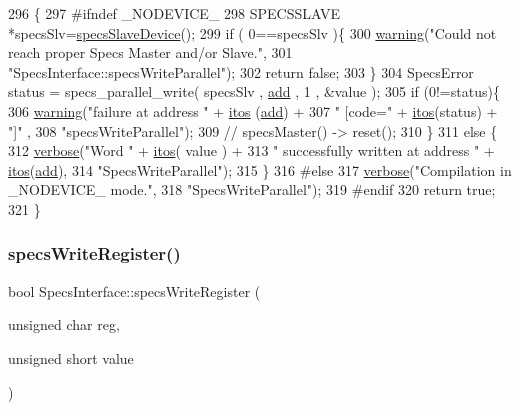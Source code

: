 \begin{DoxyCode}
296                                                 \{
297 \textcolor{preprocessor}{#ifndef \_NODEVICE\_
}
298   SPECSSLAVE *specsSlv=\hyperlink{classSpecsInterface_ac8d4711197f484f055533ec1e5ae01a1}{specsSlaveDevice}();
299   \textcolor{keywordflow}{if} ( 0==specsSlv )\{
300     \hyperlink{classObject_a65cd4fda577711660821fd2cd5a3b4c9}{warning}(\textcolor{stringliteral}{"Could not reach proper Specs Master and/or Slave."},
301             \textcolor{stringliteral}{"SpecsInterface::specsWriteParallel"});
302     \textcolor{keywordflow}{return} \textcolor{keyword}{false};
303   \}
304   SpecsError status = specs\_parallel\_write( specsSlv , \hyperlink{classAttrib_a235f773af19c900264a190b00a3b4ad7}{add} , 1 , &value );
305   \textcolor{keywordflow}{if} (0!=status)\{
306     \hyperlink{classObject_a65cd4fda577711660821fd2cd5a3b4c9}{warning}(\textcolor{stringliteral}{"failure at address "} + \hyperlink{Tools_8h_af330027dbdafb9a30768b3613c553e60}{itos} (\hyperlink{classAttrib_a235f773af19c900264a190b00a3b4ad7}{add}) +
307             \textcolor{stringliteral}{" [code="} + \hyperlink{Tools_8h_af330027dbdafb9a30768b3613c553e60}{itos}(status) + \textcolor{stringliteral}{"]"} ,
308             \textcolor{stringliteral}{"specsWriteParallel"});
309     \textcolor{comment}{//    specsMaster() -> reset();}
310   \}
311   \textcolor{keywordflow}{else} \{
312     \hyperlink{classObject_a83d2db2df682907ea1115ad721c1c4a1}{verbose}(\textcolor{stringliteral}{"Word "} + \hyperlink{Tools_8h_af330027dbdafb9a30768b3613c553e60}{itos}( value ) +
313             \textcolor{stringliteral}{" successfully written at address "} + \hyperlink{Tools_8h_af330027dbdafb9a30768b3613c553e60}{itos}(\hyperlink{classAttrib_a235f773af19c900264a190b00a3b4ad7}{add}),
314             \textcolor{stringliteral}{"SpecsWriteParallel"});
315   \}
316 \textcolor{preprocessor}{#else
}
317   \hyperlink{classObject_a83d2db2df682907ea1115ad721c1c4a1}{verbose}(\textcolor{stringliteral}{"Compilation in \_NODEVICE\_ mode."},
318           \textcolor{stringliteral}{"SpecsWriteParallel"});
319 \textcolor{preprocessor}{#endif
}
320   \textcolor{keywordflow}{return} \textcolor{keyword}{true};
321 \}
\end{DoxyCode}
\mbox{\label{classSpecsInterface_ab70adfa5ad87097469c7485126a3c61a}} 
\subsubsection{\texorpdfstring{specs\+Write\+Register()}{specsWriteRegister()}}
{\footnotesize\ttfamily bool Specs\+Interface\+::specs\+Write\+Register (\begin{DoxyParamCaption}\item[{unsigned char}]{reg,  }\item[{unsigned short}]{value }\end{DoxyParamCaption})\hspace{0.3cm}{\ttfamily [inherited]}}

